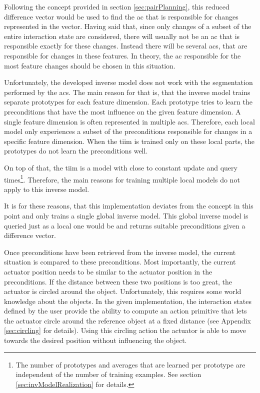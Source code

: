 Following the concept provided in section \ref{sec:pairPlanning}, this reduced difference vector would be used to find the \gls{ac} that is responsible for changes represented in the vector.
Having said that, since only changes of a subset of the entire interaction state are considered, there will usually not be an \gls{ac} that is responsible exactly for these changes. 
Instead there will be several \glspl{ac}, that are responsible for changes in these features. In theory, the \gls{ac} responsible for the most feature changes should be chosen in this situation. 

Unfortunately, the developed inverse model does not work with the segmentation performed by the \glspl{ac}. The main reason for that is, that the inverse model trains separate prototypes for each feature dimension.
Each prototype tries to learn the preconditions that have the most influence on the given feature dimension. A single feature dimension is often represented in multiple \glspl{ac}. Therefore, each local model only experiences a subset of the preconditions responsible for changes in a specific feature dimension. When the \gls{tiim} is trained only on these local parts, the prototypes do not learn the preconditions well.

On top of that, the \gls{tiim} is a model with close to constant update and query times\footnote{The number of prototypes and averages that are learned per prototype are independent of the number of training examples. See section \ref{sec:invModelRealization} for details.}. Therefore, the main reasons for training multiple local models do not apply to this inverse model.

It is for these reasons, that this implementation deviates from the concept in this point and only trains a single global inverse model.
This global inverse model is queried just as a local one would be and returns suitable preconditions given a difference vector.

Once preconditions have been retrieved from the inverse model, the current situation is compared to these preconditions. Most importantly, the current actuator position needs to be similar to the actuator position in the preconditions. If the distance between these two positions is too great, the actuator is circled around the object. Unfortunately, this requires some world knowledge about the objects. In the given implementation, the interaction states defined by the user provide the ability to compute an action primitive that lets the actuator circle around the reference object at a fixed distance (see Appendix \ref{sec:circling} for details). 
Using this circling action the actuator is able to move towards the desired position without influencing the object.

